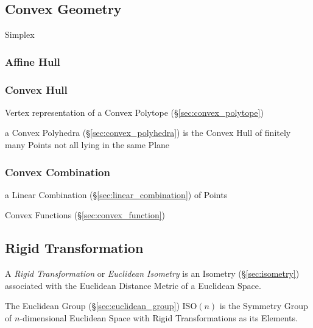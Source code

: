 \subsection{Convex Geometry}\label{sec:convex_geometry}


Simplex



\subsubsection{Affine Hull}\label{sec:affine_hull}

\subsubsection{Convex Hull}\label{sec:convex_hull}

Vertex representation of a Convex Polytope (\S\ref{sec:convex_polytope})

a Convex Polyhedra (\S\ref{sec:convex_polyhedra}) is the Convex Hull of
finitely many Points not all lying in the same Plane



\subsubsection{Convex Combination}\label{sec:convex_combination}

a Linear Combination (\S\ref{sec:linear_combination}) of Points

\fist Convex Functions (\S\ref{sec:convex_function})



\subsection{Rigid Transformation}\label{sec:rigid_transformation}

A \emph{Rigid Transformation} or \emph{Euclidean Isometry} is an Isometry
(\S\ref{sec:isometry}) associated with the Euclidean Distance Metric of a
Euclidean Space.

The Euclidean Group (\S\ref{sec:euclidean_group}) $\mathrm{ISO}(n)$ is the
Symmetry Group of $n$-dimensional Euclidean Space with Rigid Transformations as
its Elements.

